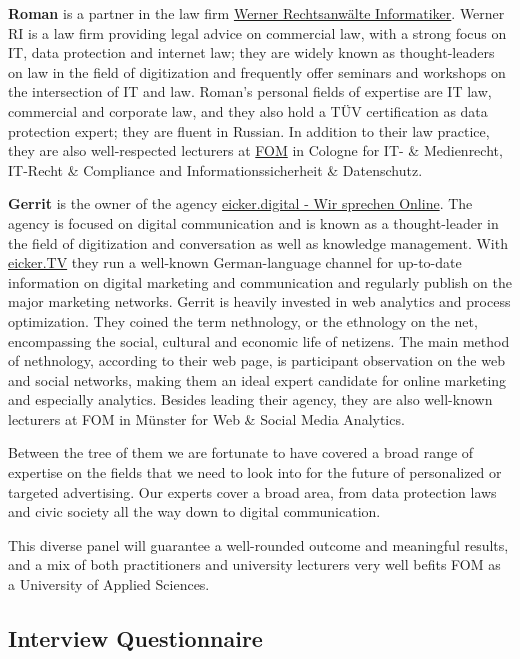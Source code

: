 \textbf{Roman} is a partner in the law firm \href{https://www.werner-ri.de/}{Werner Rechtsanwälte Informatiker}. Werner RI is a law firm providing legal advice on commercial law, with a strong focus on IT, data protection and internet law; they are widely known as thought-leaders on law in the field of digitization and frequently offer seminars and workshops on the intersection of IT and law. Roman's personal fields of expertise are IT law, commercial and corporate law, and they also hold a TÜV certification as data protection expert; they are fluent in Russian. In addition to their law practice, they are also well-respected lecturers at \href{https://www.fom.de/}{FOM} in Cologne for IT- \& Medienrecht, IT-Recht \& Compliance and Informationssicherheit \& Datenschutz.

\textbf{Gerrit} is the owner of the agency \href{https://eicker.digital/}{eicker.digital - Wir sprechen Online}. The agency is focused on digital communication and is known as a thought-leader in the field of digitization and conversation as well as knowledge management. With \href{https://www.youtube.com/eickertv}{eicker.TV} they run a well-known German-language channel for up-to-date information on digital marketing and communication and regularly publish on the major marketing networks. Gerrit is heavily invested in web analytics and process optimization. They coined the term nethnology, or the ethnology on the net, encompassing the social, cultural and economic life of netizens. The main method of nethnology, according to their web page, is participant observation on the web and social networks, making them an ideal expert candidate for online marketing and especially analytics. Besides leading their agency, they are also well-known lecturers at FOM in Münster for Web \& Social Media Analytics.

Between the tree of them we are fortunate to have covered a broad range of expertise on the fields that we need to look into for the future of personalized or targeted advertising. Our experts cover a broad area, from data protection laws and civic society all the way down to digital communication. 

This diverse panel will guarantee a well-rounded outcome and meaningful results, and a mix of both practitioners and university lecturers very well befits FOM as a University of Applied Sciences.

\subsection{Interview Questionnaire}

